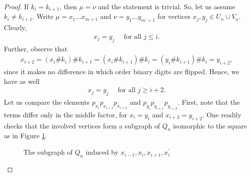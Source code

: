 \documentclass[a4paper]{amsart}
\begin{document}
\begin{proof}
    If $k_i = k_{i+1}$, then $\mu = \nu$ and the statement is trivial. So, let us assume $k_i \neq k_{i+1}$.
    Write $\mu = x_1 \dots x_{m+1}$ and $\nu = y_1 \dots y_{m^\prime + 1}$ for vertices $x_j, y_j \in U_n \cup V_n$. Clearly,
    \begin{align*}
        x_j = y_j \quad \text{ for all } j \leq i.
    \end{align*}
    Further, observe that 
    \begin{align*}
        x_{i+2} = (x_{i} \# k_i) \# k_{i+1} = (x_{i} \# k_{i+1}) \# k_i = (y_{i} \# k_{i+1}) \# k_i = y_{i+2},
    \end{align*}
    since it makes no difference in which order binary digits are flipped.
    Hence, we have as well
    \begin{align*}
        x_j = y_j \quad \text{ for all } j \geq i+2.
    \end{align*}
    Let us compare the elements $p_{x_{i}} p_{x_{i+1}} p_{x_{i+2}}$ and $p_{y_i} p_{y_{i+1}} p_{y_{i+2}}$. First, note that the terms differ only in the middle factor, for $x_i = y_i$ and $x_{i+2} = y_{i+2}$. One readily checks that the involved vertices form a subgraph of $Q_n$ isomorphic to the square as in Figure \ref{sub::fig:square_in_hypercube}.
    \begin{figure}[ht]
        \caption{The subgraph of $Q_n$ induced by $x_{i-1}, x_i, x_{i+1}, x_i^\prime$}
        \label{sub::fig:square_in_hypercube}
    \end{figure}


\end{proof}
\end{document}

